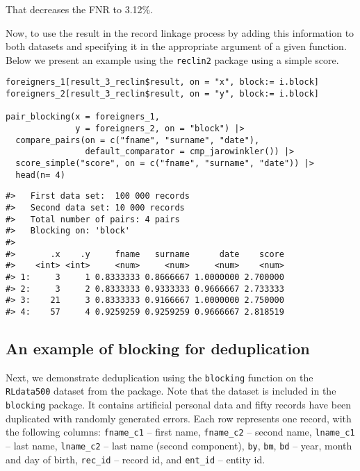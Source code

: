 That decreases the FNR to
3.12\%.

Now, to use the result in the record linkage process by adding this information to both datasets
and specifying it in the appropriate argument of a given function. Below we present an example using the
\texttt{reclin2} package using a simple score.

\begin{verbatim}
foreigners_1[result_3_reclin$result, on = "x", block:= i.block]
foreigners_2[result_3_reclin$result, on = "y", block:= i.block]

pair_blocking(x = foreigners_1, 
              y = foreigners_2, on = "block") |>
  compare_pairs(on = c("fname", "surname", "date"),
                default_comparator = cmp_jarowinkler()) |>
  score_simple("score", on = c("fname", "surname", "date")) |>
  head(n= 4)
\end{verbatim}

\begin{verbatim}
#>   First data set:  100 000 records
#>   Second data set: 10 000 records
#>   Total number of pairs: 4 pairs
#>   Blocking on: 'block'
#> 
#>       .x    .y     fname   surname      date    score
#>    <int> <int>     <num>     <num>     <num>    <num>
#> 1:     3     1 0.8333333 0.8666667 1.0000000 2.700000
#> 2:     3     2 0.8333333 0.9333333 0.9666667 2.733333
#> 3:    21     3 0.8333333 0.9166667 1.0000000 2.750000
#> 4:    57     4 0.9259259 0.9259259 0.9666667 2.818519
\end{verbatim}

\subsection{An example of blocking for deduplication}\label{an-example-of-blocking-for-deduplication}

Next, we demonstrate deduplication using the \texttt{blocking} function on the
\texttt{RLdata500} dataset from the  package. Note that
the dataset is included in the \texttt{blocking} package. It contains
artificial personal data and fifty records have been duplicated with
randomly generated errors. Each row represents one record, with the
following columns: \texttt{fname\_c1} -- first name, \texttt{fname\_c2} -- second name,
\texttt{lname\_c1} -- last name, \texttt{lname\_c2} -- last name (second component),
\texttt{by}, \texttt{bm}, \texttt{bd} -- year, month and day of birth, \texttt{rec\_id} -- record id, and
\texttt{ent\_id} -- entity id.

